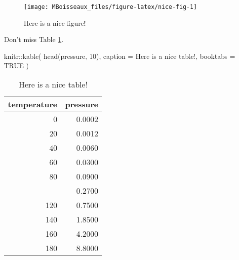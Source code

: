 \documentclass[
]{book}
\newenvironment{Shaded}{\begin{snugshade}}{\end{snugshade}}
\newcommand{\AttributeTok}[1]{\textcolor[rgb]{0.77,0.63,0.00}{#1}}
\newcommand{\ConstantTok}[1]{\textcolor[rgb]{0.00,0.00,0.00}{#1}}
\newcommand{\DecValTok}[1]{\textcolor[rgb]{0.00,0.00,0.81}{#1}}
\newcommand{\FunctionTok}[1]{\textcolor[rgb]{0.00,0.00,0.00}{#1}}
\newcommand{\NormalTok}[1]{#1}
\newcommand{\SpecialCharTok}[1]{\textcolor[rgb]{0.00,0.00,0.00}{#1}}
\newcommand{\StringTok}[1]{\textcolor[rgb]{0.31,0.60,0.02}{#1}}
\begin{document}
\begin{figure}

{\centering \texttt{[image: MBoisseaux\_files/figure-latex/nice-fig-1]} 

}

\caption{Here is a nice figure!}\label{fig:nice-fig}
\end{figure}

Don't miss Table \ref{tab:nice-tab}.

\begin{Shaded}
\begin{Highlighting}[]
\NormalTok{knitr}\SpecialCharTok{::}\FunctionTok{kable}\NormalTok{(}
  \FunctionTok{head}\NormalTok{(pressure, }\DecValTok{10}\NormalTok{), }\AttributeTok{caption =} \StringTok{\textquotesingle{}Here is a nice table!\textquotesingle{}}\NormalTok{,}
  \AttributeTok{booktabs =} \ConstantTok{TRUE}
\NormalTok{)}
\end{Highlighting}
\end{Shaded}

\begin{table}

\caption{\label{tab:nice-tab}Here is a nice table!}
\centering
\begin{tabular}[t]{rr}
\toprule
temperature & pressure\\
\midrule
0 & 0.0002\\
20 & 0.0012\\
40 & 0.0060\\
60 & 0.0300\\
80 & 0.0900\\
\addlinespace
100 & 0.2700\\
120 & 0.7500\\
140 & 1.8500\\
160 & 4.2000\\
180 & 8.8000\\
\bottomrule
\end{tabular}
\end{table}

  
\end{document}
